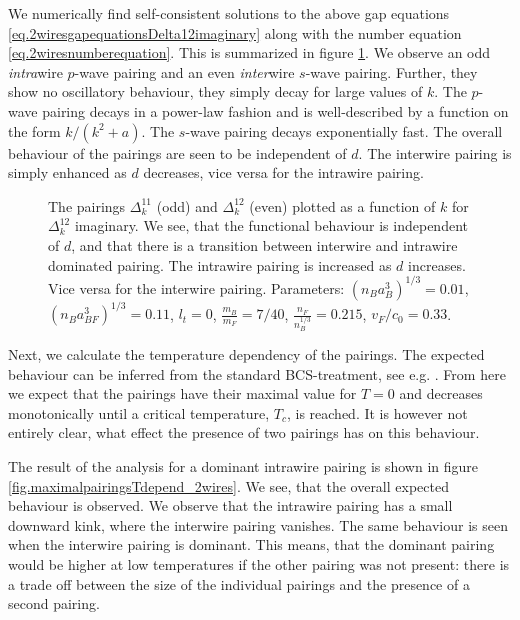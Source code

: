 We numerically find self-consistent solutions to the above gap equations \eqref{eq.2wiresgapequationsDelta12imaginary} along with the number equation \eqref{eq.2wiresnumberequation}. This is summarized in figure \ref{fig.pairingkdependT0dvaried}. We observe an odd \textit{intra}wire $p$-wave pairing and an even \textit{inter}wire $s$-wave pairing. Further, they show no oscillatory behaviour, they simply decay for large values of $k$. The $p$-wave pairing decays in  a power-law fashion and is well-described by a function on the form $k / (k^2 + a)$. The $s$-wave pairing decays exponentially fast. The overall behaviour of the pairings are seen to be independent of $d$. The interwire pairing is simply enhanced as $d$ decreases, vice versa for the intrawire pairing.  

\begin{figure} 
\begin{center}  
  
\caption{The pairings $\Delta^{11}_k$ (odd) and $\Delta^{12}_k$ (even) plotted as a function of $k$ for $\Delta^{12}_k$ imaginary. We see, that the functional behaviour is independent of $d$, and that there is a transition between interwire and intrawire dominated pairing. The intrawire pairing is increased as $d$ increases. Vice versa for the interwire pairing. Parameters: $(n_Ba_B^3)^{1/3} = 0.01$, $(n_Ba_{BF}^3)^{1/3} = 0.11$, $l_t = 0$, $\frac{m_B}{m_F} = 7/40$, $\frac{n_F}{n_B^{1/3}} = 0.215$, $v_F/c_0 = 0.33$. }  
\label{fig.pairingkdependT0dvaried}  
\end{center}    
\end{figure}

Next, we calculate the temperature dependency of the pairings. The expected behaviour can be inferred from the standard BCS-treatment, see e.g. \cite[p. 369]{PlischkeStatPhys}. From here we expect that the pairings have their maximal value for $T = 0$ and decreases monotonically until a critical temperature, $T_c$, is reached. It is however not entirely clear, what effect the presence of two pairings has on this behaviour. 

The result of the analysis for a dominant intrawire pairing is shown in figure \ref{fig.maximalpairingsTdepend_2wires}. We see, that the overall expected behaviour is observed. We observe that the intrawire pairing has a small downward kink, where the interwire pairing vanishes. The same behaviour is seen when the interwire pairing is dominant. This means, that the dominant pairing would be higher at low temperatures if the other pairing was not present: there is a trade off between the size of the individual pairings and the presence of a second pairing.

